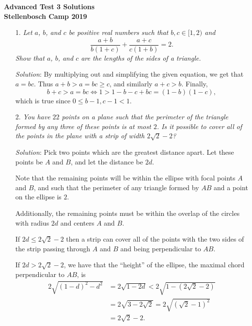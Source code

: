 \documentclass{article}
\begin{document}
\begin{center}
  \textbf{\Large Advanced Test 3 Solutions}
  \\ \vspace{1em}
  \textbf{\large Stellenbosch Camp 2019}
\end{center}

\vspace{12pt}


\begin{enumerate}

\item[1.] %
{\itshape
Let $a$, $b$, and $c$ be positive real numbers such that $b, c \in [1,2)$ and
\[ \frac{a+b}{b(1+c)} +\frac{a+c}{c(1+b)} = 2. \]
Show that $a$, $b$, and $c$ are the lengths of the sides of a triangle. 
}

\textit{Solution}:
By multiplying out and simplifying the given equation, we get that $a = bc$.
Thus $a + b > a = bc \geq c$, and similarly $a+c > b$.
Finally,
\[ b+c > a = bc \iff 1 > 1 -b -c +bc = (1-b)(1-c), \]
which is true since $0 \leq b-1, c-1 < 1$.


\item[2.] %
{\itshape
You have $22$ points on a plane such that the perimeter of the triangle formed by any three of these points is at most $2$. Is it possible to cover all of the points in the plane with a strip of width $2\sqrt{2} - 2$?
}

\textit{Solution}:
Pick two points which are the greatest distance apart. Let these points be $A$ and $B$, and let the distance be $2d$.

Note that the remaining points will be within the ellipse with focal points $A$ and $B$, and such that the perimeter of any triangle formed by $AB$ and a point on the ellipse is $2$.

Additionally, the remaining points must be within the overlap of the circles with radius $2d$ and centers $A$ and $B$.

If $2d \leq 2\sqrt{2} - 2$ then a strip can cover all of the points with the two sides of the strip passing through $A$ and $B$ and being perpendicular to $AB$.

If $2d > 2\sqrt{2} - 2$, we have that the ``height'' of the ellipse, the maximal chord perpendicular to $AB$, is
\begin{align*}
	2 \sqrt{{(1 - d)}^2 - d^2} & = 2 \sqrt{1 - 2d} < 2 \sqrt{1 - (2\sqrt{2} - 2)} \\
	& = 2 \sqrt{3 - 2\sqrt{2}} = 2 \sqrt{{(\sqrt{2} - 1)}^2} \\
	& = 2 \sqrt{2} - 2.
\end{align*}


\end{enumerate}
\end{document}
